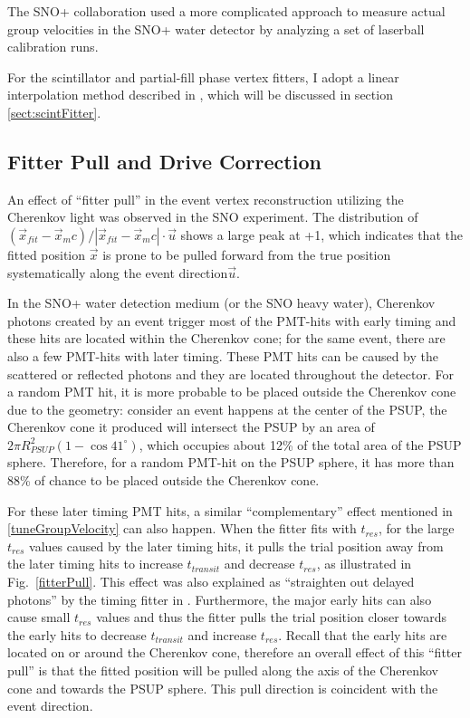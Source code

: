 The SNO+ collaboration used a more complicated approach to measure actual group velocities in the SNO+ water detector by analyzing a set of laserball calibration runs\cite{groupVmeasure,anderson2021optical}.

For the scintillator and partial-fill phase vertex fitters, I adopt a linear interpolation method described in \cite{coulter2013modelling}, which will be discussed in section \ref{sect:scintFitter}.

\subsection{Fitter Pull and Drive Correction}\label{sect:fitterPull}

An effect of ``fitter pull'' in the event vertex reconstruction utilizing the Cherenkov light was observed in the SNO experiment. The distribution of $(\vec{x}_{fit}-\vec{x}_mc)/|\vec{x}_{fit}-\vec{x}_mc|\cdot \vec{u}$ shows a large peak at +1, which indicates that the fitted position $\vec{x}$ is prone to be pulled forward from the true position systematically along the event direction$\vec{u}$\cite{driveCorPeter,brice1996monte,coulter2013modelling}. 

In the SNO+ water detection medium (or the SNO heavy water), Cherenkov photons created by an event trigger most of the PMT-hits with early timing and these hits are located within the Cherenkov cone; for the same event, there are also a few PMT-hits with later timing. These PMT hits can be caused by the scattered or reflected photons and they are located throughout the detector. For a random PMT hit, it is more probable to be placed outside the Cherenkov cone due to the geometry: consider an event happens at the center of the PSUP, the Cherenkov cone it produced will intersect the PSUP by an area of $2\pi R^2_{PSUP}(1-\cos41^\circ)$, which occupies about 12\% of the total area of the PSUP sphere. Therefore, for a random PMT-hit on the PSUP sphere, it has more than 88\% of chance to be placed outside the Cherenkov cone. 

For these later timing PMT hits, a similar ``complementary'' effect mentioned in \ref{tuneGroupVelocity} can also happen. When the fitter fits with $t_{res}$, for the large $t_{res}$ values caused by the later timing hits, it pulls the trial position away from the later timing hits to increase $t_{transit}$ and decrease $t_{res}$, as illustrated in Fig.~\ref{fitterPull}. This effect was also explained as ``straighten out delayed photons'' by the timing fitter in \cite{driveCorPeter}. Furthermore, the major early hits can also cause small $t_{res}$ values and thus the fitter pulls the trial position closer towards the early hits to decrease $t_{transit}$ and increase $t_{res}$. Recall that the early hits are located on or around the Cherenkov cone, therefore an overall effect of this ``fitter pull'' is that the fitted position will be pulled along the axis of the Cherenkov cone and towards the PSUP sphere. This pull direction is coincident with the event direction.

